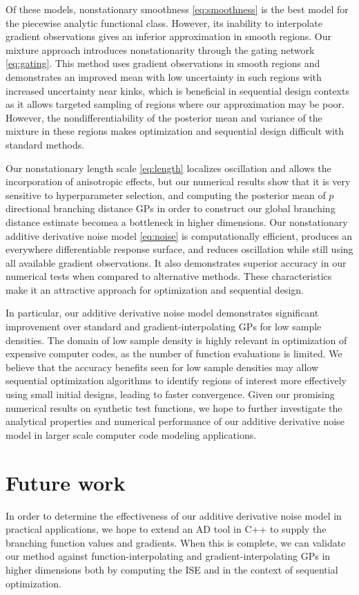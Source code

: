 \documentclass{article}
\numberwithin{equation}{section}
\begin{document}
Of these models, nonstationary smoothness \eqref{eq:smoothness} is the best model for the piecewise analytic functional class. However, its inability to interpolate gradient observations gives an inferior approximation in smooth regions. Our mixture approach introduces nonstationarity through the gating network \eqref{eq:gating}. This method uses gradient observations in smooth regions and demonstrates an improved mean with low uncertainty in such regions with increased uncertainty near kinks, which is beneficial in sequential design contexts as it allows targeted sampling of regions where our approximation may be poor. However, the nondifferentiability of the posterior mean and variance of the mixture in these regions makes optimization and sequential design difficult with standard methods.

Our nonstationary length scale \eqref{eq:length} localizes oscillation and allows the incorporation of anisotropic effects, but our numerical results show that it is very sensitive to hyperparameter selection, and computing the posterior mean of $p$ directional branching distance GPs in order to construct our global branching distance estimate becomea a bottleneck in higher dimensions. Our nonstationary additive derivative noise model \eqref{eq:noise} is computationally efficient, produces an everywhere differentiable response surface, and reduces oscillation while still using all available gradient observations. It also demonstrates superior accuracy in our numerical tests when compared to alternative methods. These characteristics make it an attractive approach for optimization and sequential design.

In particular, our additive derivative noise model demonstrates significant improvement over standard and gradient-interpolating GPs for low sample densities. The domain of low sample density is highly relevant in optimization of expensive computer codes, as the number of function evaluations is limited. We believe that the accuracy benefits seen for low sample densities may allow sequential optimization algorithms to identify regions of interest more effectively using small initial designs, leading to faster convergence. Given our promising numerical results on synthetic test functions, we hope to further investigate the analytical properties and numerical performance of our additive derivative noise model in larger scale computer code modeling applications.

\section{Future work} \label{future-work}
In order to determine the effectiveness of our additive derivative noise model in practical applications, we hope to extend an AD tool in C++ to supply the branching function values and gradients. When this is complete, we can validate our method against function-interpolating and gradient-interpolating GPs in higher dimensions both by computing the ISE and in the context of sequential optimization.
\end{document}
